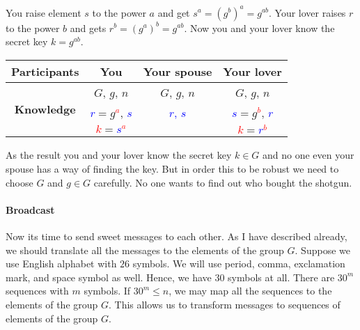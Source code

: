 You raise element $s$ to the power $a$ and get $s^a = (g^b)^a = g^{ab}$. Your lover raises $r$ to the power $b$ and gets $r^b = (g^a)^b = g^{ab}$. Now you and your lover know the secret key $k = g^{ab}$.
\begin{center}
\begin{tabular}{|c|c|c|c|}
\hline
{\bf Participants}&{You}&{Your spouse}&{Your lover}\\
\hline
\multirow{3}{*}{\bf Knowledge}&{\textcolor{OliveGreen}{$G$}, \textcolor{OliveGreen}{$g$}, \textcolor{OliveGreen}{$n$}}&{\textcolor{OliveGreen}{$G$}, \textcolor{OliveGreen}{$g$}, \textcolor{OliveGreen}{$n$}}&{\textcolor{OliveGreen}{$G$}, \textcolor{OliveGreen}{$g$}, \textcolor{OliveGreen}{$n$}}\\
{}&{ \textcolor{blue}{$r$}$=$\textcolor{OliveGreen}{$ g$}\textcolor{red}{${}^a$}, \textcolor{blue}{$s$}}&{\textcolor{blue}{$r$, $s$}}&{ \textcolor{blue}{$s$}$=$\textcolor{OliveGreen}{$g$}\textcolor{red}{${}^b$}, \textcolor{blue}{$r$}}\\
{}&{ \textcolor{red}{$k$}$=$\textcolor{blue}{$s$}\textcolor{red}{${}^a$}}&{}&{ \textcolor{red}{$k$}$=$\textcolor{blue}{$r$}\textcolor{red}{${}^b$}}\\
\hline
\end{tabular}
\end{center}

As the result you and your lover know the secret key $k\in G$ and no one even your spouse has a way of finding the key. But in order this to be robust we need to choose $G$ and $g\in G$ carefully. No one wants to find out who bought the shotgun.

\paragraph{Broadcast}

Now its time to send sweet messages to each other. As I have described already, we should translate all the messages to the elements of the group $G$. Suppose we use English alphabet with $26$ symbols. We will use period, comma, exclamation mark, and space symbol as well. Hence, we have $30$ symbols at all. There are $30^m$ sequences with $m$ symbols. If $30^m \leqslant n$, we may map all the sequences to the elements of the group $G$. This allows us to transform messages to sequences of elements of the group $G$.

